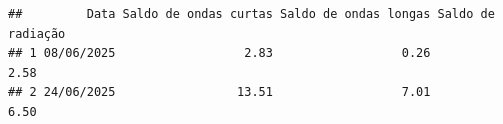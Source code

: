 \documentclass[
]{article}
\begin{document}
\begin{verbatim}
##         Data Saldo de ondas curtas Saldo de ondas longas Saldo de radiação
## 1 08/06/2025                  2.83                  0.26              2.58
## 2 24/06/2025                 13.51                  7.01              6.50
\end{verbatim}
\end{document}
